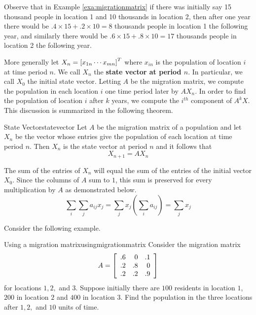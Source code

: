Observe that in Example \ref{exa:migrationmatrix} if there was initially say 15
thousand people in location 1 and 10 thousands in location 2, then
after one year there would be $.4 \times 15 + .2 \times 10 = 8$
thousands people in location 1 the following year, and similarly 
there would be $.6 \times 15 + .8 \times 10 = 17$
thousands people in location 2 the following year.

More generally let $X_n=\left[ x_{1n} \cdots x_{mn}\right] ^{T}$ where $x_{in}$ is the
population of location $i$ at time period $n$. We call $X_n$ the \textbf{state vector at period $n$}. In particular, we call $X_0$ the initial state vector. Letting $A$ be the migration matrix, we compute the population in each location $i$ one time period later by $AX_n$. In order to find the population of location $i$ after $k$
years, we compute the $i^{th}$ component of $A^{k}X.$ This discussion is summarized in the following theorem. 

\begin{theorem}{State Vector}{statevector}
Let $A$ be the migration matrix of a population and let $X_n$ be the vector whose entries give the population of each location at time period $n$. Then $X_n$ is the state vector at period $n$ and it follows that 
\[
X_{n+1} = A X_n
\]
\end{theorem}

The sum of the entries of $X_n$ will equal the sum of the entries of the initial
vector $X_{0}$. Since the columns of $A$ sum to $1$, this sum is preserved for every
multiplication by $A$ as demonstrated below. 
\begin{equation*}
\sum_{i}\sum_{j}a_{ij}x_{j}=\sum_{j}x_{j}\left( \sum_{i}a_{ij}\right)
=\sum_{j}x_{j}
\end{equation*}

Consider the following example.

\begin{example}{Using a migration matrix}{usingmigrationmatrix}
Consider the migration matrix 
\begin{equation*}
A = 
\left[
\begin{array}{rrr}
.6 & 0 & .1 \\
.2 & .8 & 0 \\
.2 & .2 & .9
\end{array}
\right] 
\end{equation*}
 for locations $1,2,$ and $3.$ Suppose initially there are $100$
residents in location $1$, $200$ in location $2$ and $400$ in location $3$. Find the
population in the three locations after $1,2,$ and $10$ units of time.
\end{example}

